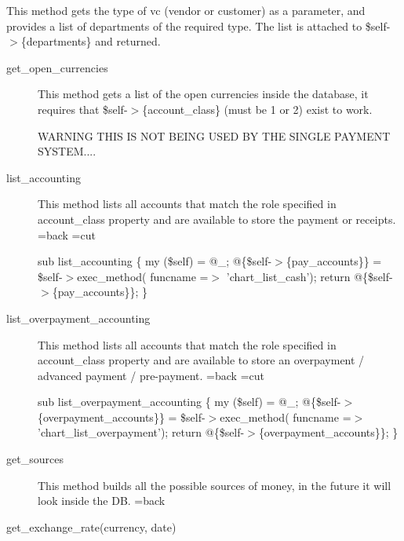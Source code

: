 \begin{description}
\begin{description}
\begin{description}
\begin{description}
\begin{description}
\begin{description}
\begin{description}
\begin{description}
\begin{description}
\begin{description}
This method gets the type of vc (vendor or customer) as a parameter, and provides a list of departments
of the required type.
The list is attached to \$self-$>$\{departments\} and returned.

\end{description}
\begin{description}

\item[{get\_open\_currencies}] \mbox{}

This method gets a list of the open currencies inside the database, it requires that  
\$self-$>$\{account\_class\} (must be 1 or 2)  exist to work.



WARNING THIS IS NOT BEING USED BY THE SINGLE PAYMENT SYSTEM....

\end{description}
\begin{description}

\item[{list\_accounting}] \mbox{}

This method lists all accounts that match the role specified in account\_class property and
are available to store the payment or receipts. 
=back
=cut



sub list\_accounting \{
 my (\$self) = @\_;
 @\{\$self-$>$\{pay\_accounts\}\} = \$self-$>$exec\_method( funcname =$>$ 'chart\_list\_cash');
 return @\{\$self-$>$\{pay\_accounts\}\}; 
\}


\item[{list\_overpayment\_accounting}] \mbox{}

This method lists all accounts that match the role specified in account\_class property and
are available to store an overpayment / advanced payment / pre-payment. 
=back
=cut



sub list\_overpayment\_accounting \{
 my (\$self) = @\_;
 @\{\$self-$>$\{overpayment\_accounts\}\} = \$self-$>$exec\_method( funcname =$>$ 'chart\_list\_overpayment');
 return @\{\$self-$>$\{overpayment\_accounts\}\}; 
\}


\item[{get\_sources}] \mbox{}

This method builds all the possible sources of money,
in the future it will look inside the DB. 
=back


\item[{get\_exchange\_rate(currency, date)}] \mbox{}


\end{description}
\end{description}
\end{description}
\end{description}
\end{description}
\end{description}
\end{description}
\end{description}
\end{description}
\end{description}
